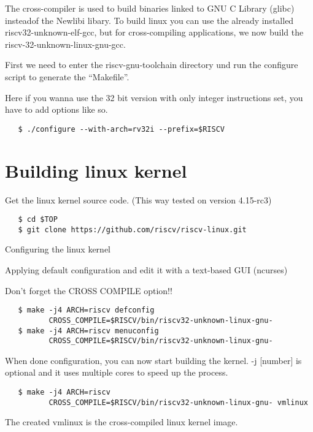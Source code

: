 The cross-compiler is used to build binaries linked to GNU C Library (glibc) insteadof the Newlibi libary.
To build linux you can use the already installed riscv32-unknown-elf-gcc, but for cross-compiling applications, we now build the riscv-32-unknown-linux-gnu-gcc.

First we need to enter the riscv-gnu-toolchain directory und run the configure script to generate the ``Makefile''.

Here if you wanna use the 32 bit version with only integer instructions set, you have to add options like so. 
\begin{verbatim}
   $ ./configure --with-arch=rv32i --prefix=$RISCV
\end{verbatim}

\section{Building linux kernel}

Get the linux kernel source code. (This way tested on version 4.15-rc3)

\begin{verbatim}
   $ cd $TOP
   $ git clone https://github.com/riscv/riscv-linux.git
\end{verbatim}

Configuring the linux kernel

Applying default configuration and edit it with a text-based GUI (ncurses)

Don't forget the CROSS COMPILE option!!

\begin{verbatim}
   $ make -j4 ARCH=riscv defconfig
          CROSS_COMPILE=$RISCV/bin/riscv32-unknown-linux-gnu-
   $ make -j4 ARCH=riscv menuconfig
          CROSS_COMPILE=$RISCV/bin/riscv32-unknown-linux-gnu-
\end{verbatim}

When done configuration, you can now start building the kernel.
-j [number] is optional and it uses multiple cores to speed up the process. 

\begin{verbatim}
   $ make -j4 ARCH=riscv 
          CROSS_COMPILE=$RISCV/bin/riscv32-unknown-linux-gnu- vmlinux
\end{verbatim}

The created vmlinux is the cross-compiled linux kernel image.
